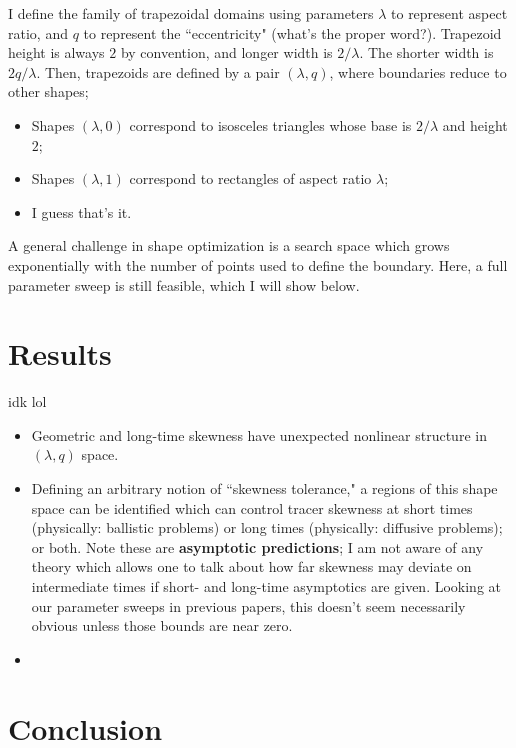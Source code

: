 \documentclass{amsart}
\begin{document}
I define the family of trapezoidal domains using parameters $\lambda$ 
to represent aspect ratio, and $q$ to represent the ``eccentricity" 
(what's the proper word?). Trapezoid height is always $2$ by convention, 
and longer width is $2/\lambda$. The shorter width is $2q/\lambda$. 
Then, trapezoids are defined by a pair $(\lambda,q)$, where boundaries 
reduce to other shapes;
%
\begin{itemize}
\item Shapes $(\lambda,0)$ correspond to isosceles triangles whose base is 
$2/\lambda$ and height $2$;
\item Shapes $(\lambda,1)$ correspond to rectangles of aspect ratio $\lambda$;
\item I guess that's it.
\end{itemize}
%
A general challenge in shape optimization is a search space which 
grows exponentially with the number of points used to define the 
boundary. Here, a full parameter sweep is still feasible, 
which I will show below.

\section{Results}
idk lol
\begin{itemize}
\item Geometric and long-time skewness have unexpected nonlinear 
structure in $(\lambda,q)$ space.
\item Defining an arbitrary notion of ``skewness tolerance," a 
regions of this shape space can be identified which can control 
tracer skewness at short times (physically: ballistic problems) 
or long times (physically: diffusive problems); or both. Note these are 
\textbf{asymptotic predictions}; I am not aware of any theory 
which allows one to talk about how far skewness may deviate 
on intermediate times if short- and long-time asymptotics are 
given. Looking at our parameter sweeps in previous papers, 
this doesn't seem necessarily obvious unless those bounds are 
near zero.
\item 
\end{itemize}

\section{Conclusion}
\lipsum[1]
\end{document}
